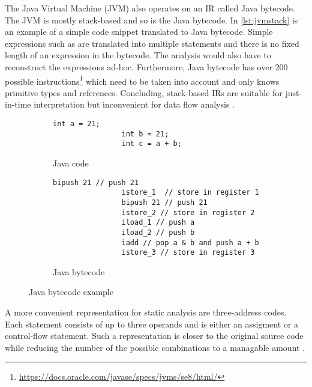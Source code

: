 \documentclass[../draft.tex]{subfiles}
\begin{document}
    The Java Virtual Machine (JVM) also operates on an IR called Java bytecode. The JVM is mostly stack-based and so is the Java bytecode. In \autoref{lst:jvmstack} is an example of a simple code snippet translated to Java bytecode. Simple expressions such as  are translated into multiple statements and there is no fixed length of an expression in the bytecode. The analysis would also have to reconstruct the expressions ad-hoc. Furthermore, Java bytecode has over 200 possible instructions\footnote{\url{https://docs.oracle.com/javase/specs/jvms/se8/html/}} which need to be taken into account and only knows primitive types and references. Concluding, stack-based IRs are suitable for just-in-time interpretation but inconvenient for data flow analysis \cite{Valleerai2004}.

    \begin{figure}[ht]
        \centering
        \begin{subfigure}[b]{0.45\textwidth}
            \centering
            \begin{lstlisting}[gobble=16]
                int a = 21;
                int b = 21;
                int c = a + b;
            \end{lstlisting}
            \caption{Java code}
            \label{lst:jvmstack_a}
        \end{subfigure}
        \hfill
        \begin{subfigure}[b]{0.45\textwidth}
            \centering
            \begin{lstlisting}[gobble=16]
                bipush 21 // push 21
                istore_1  // store in register 1    
                bipush 21 // push 21
                istore_2 // store in register 2
                iload_1 // push a
                iload_2 // push b
                iadd // pop a & b and push a + b
                istore_3 // store in register 3
            \end{lstlisting}
            \caption{Java bytecode}
            \label{lst:jvmstack_b}
        \end{subfigure}
        \caption{Java bytecode example}
        \label{lst:jvmstack}
    \end{figure}

    A more convenient representation for static analysis are three-address codes. Each statement consists of up to three operands and is either an assigment or a control-flow statement. Such a representation is closer to the original source code while reducing the number of the possible combinations to a managable amount \cite{Aho1986}.
\end{document}
